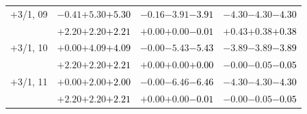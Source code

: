 \documentclass[compress]{beamer}
\begin{document}
\begin{frame}
\begin{tabular}{r | c | c | c}
$+$3/1, 09 & $-0.41$\hspace{0.1 cm}$+5.30$\hspace{0.1 cm}\textcolor{black}{$+5.30$} & $-0.16$\hspace{0.1 cm}$-3.91$\hspace{0.1 cm}\textcolor{black}{$-3.91$} & $-4.30$\hspace{0.1 cm}$-4.30$\hspace{0.1 cm}\textcolor{black}{$-4.30$} \\
           & $+2.20$\hspace{0.1 cm}$+2.20$\hspace{0.1 cm}\textcolor{black}{$+2.21$} & $+0.00$\hspace{0.1 cm}$+0.00$\hspace{0.1 cm}\textcolor{black}{$-0.01$} & $+0.43$\hspace{0.1 cm}$+0.38$\hspace{0.1 cm}\textcolor{black}{$+0.38$} \\
$+$3/1, 10 & $+0.00$\hspace{0.1 cm}$+4.09$\hspace{0.1 cm}\textcolor{black}{$+4.09$} & $-0.00$\hspace{0.1 cm}$-5.43$\hspace{0.1 cm}\textcolor{black}{$-5.43$} & $-3.89$\hspace{0.1 cm}$-3.89$\hspace{0.1 cm}\textcolor{black}{$-3.89$} \\
           & $+2.20$\hspace{0.1 cm}$+2.20$\hspace{0.1 cm}\textcolor{black}{$+2.21$} & $+0.00$\hspace{0.1 cm}$+0.00$\hspace{0.1 cm}\textcolor{black}{$+0.00$} & $-0.00$\hspace{0.1 cm}$-0.05$\hspace{0.1 cm}\textcolor{black}{$-0.05$} \\
$+$3/1, 11 & $+0.00$\hspace{0.1 cm}$+2.00$\hspace{0.1 cm}\textcolor{black}{$+2.00$} & $-0.00$\hspace{0.1 cm}$-6.46$\hspace{0.1 cm}\textcolor{black}{$-6.46$} & $-4.30$\hspace{0.1 cm}$-4.30$\hspace{0.1 cm}\textcolor{black}{$-4.30$} \\
           & $+2.20$\hspace{0.1 cm}$+2.20$\hspace{0.1 cm}\textcolor{black}{$+2.21$} & $+0.00$\hspace{0.1 cm}$+0.00$\hspace{0.1 cm}\textcolor{black}{$-0.01$} & $-0.00$\hspace{0.1 cm}$-0.05$\hspace{0.1 cm}\textcolor{black}{$-0.05$} \\

\end{tabular}
\end{frame}
\end{document}
